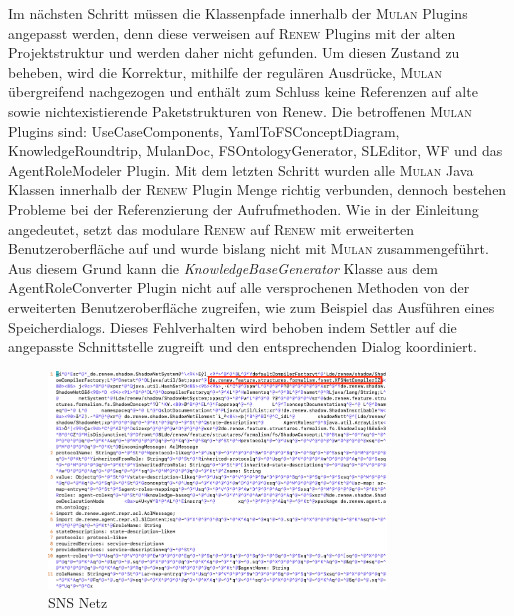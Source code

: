 	Im nächsten Schritt müssen die Klassenpfade innerhalb der \textsc{Mulan} Plugins angepasst werden, denn diese verweisen auf \textsc{Renew} Plugins mit der alten Projektstruktur und werden daher nicht gefunden. Um diesen Zustand zu beheben, wird die Korrektur, mithilfe der regulären Ausdrücke, \textsc{Mulan} übergreifend nachgezogen und enthält zum Schluss keine Referenzen auf alte sowie nichtexistierende Paketstrukturen von Renew. Die betroffenen \textsc{Mulan} Plugins sind: UseCaseComponents, YamlToFSConceptDiagram, KnowledgeRoundtrip, MulanDoc, FSOntologyGenerator, SLEditor, WF und das AgentRoleModeler Plugin. \newline
	Mit dem letzten Schritt wurden alle \textsc{Mulan} Java Klassen innerhalb der \textsc{Renew} Plugin Menge richtig verbunden, dennoch bestehen Probleme bei der Referenzierung der Aufrufmethoden. Wie in der Einleitung angedeutet, setzt das modulare \textsc{Renew} auf \textsc{Renew} mit erweiterten Benutzeroberfläche auf und wurde bislang nicht mit \textsc{Mulan} zusammengeführt. Aus diesem Grund kann die \textit{KnowledgeBaseGenerator} Klasse aus dem AgentRoleConverter Plugin nicht auf alle versprochenen Methoden von der erweiterten Benutzeroberfläche zugreifen, wie zum Beispiel das Ausführen eines Speicherdialogs. Dieses Fehlverhalten wird behoben indem Settler auf die angepasste Schnittstelle zugreift und den entsprechenden Dialog koordiniert. \bigbreak

	\begin{figure}[h!]
	  \centering
	  \includegraphics[width=0.8\textwidth]{material/images/shadownet.png}
	  \caption{SNS Netz}
	  \label{fig:sns_netz}
	\end{figure}

